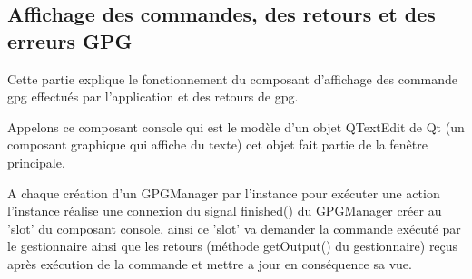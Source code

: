 \documentclass{../res/univ-projet}
\begin{document}
  \begin{center}
  \end{center}


  \subsection{Affichage des commandes, des retours et des erreurs GPG}

  Cette partie explique le fonctionnement du composant d'affichage
  des commande gpg effectués par l'application et des retours de gpg.

  Appelons ce composant console qui est le modèle d'un objet QTextEdit de Qt (un composant graphique qui affiche du texte)
  cet objet fait partie de la fenêtre principale.
  
  A chaque création d'un GPGManager par l'instance
  pour exécuter une action l'instance réalise une connexion du signal finished() du GPGManager créer
  au 'slot' du composant console, ainsi ce 'slot' va demander la commande exécuté par le gestionnaire
  ainsi que les retours (méthode getOutput() du gestionnaire) reçus après exécution de la commande
  et mettre a jour en conséquence sa vue.
\end{document}
